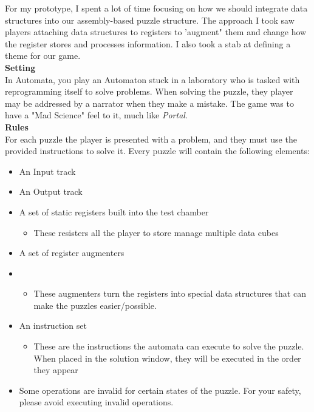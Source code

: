 For my prototype, I spent a lot of time focusing on how we should integrate data structures into our assembly-based
puzzle structure. The approach I took saw players attaching data structures to registers to 'augment" them and
change how the register stores and processes information. I also took a stab at defining a theme for our game.\\

\textbf{Setting}\\
In Automata, you play an Automaton stuck in a laboratory who is tasked with reprogramming itself to solve problems.
When solving the puzzle, they player may be addressed by a narrator when they make a mistake. The game was to have 
a "Mad Science" feel to it, much like \textit{Portal}.\\

\textbf{Rules}\\
For each puzzle the player is presented with a problem, and they must use the provided instructions to solve it. 
Every puzzle will contain the following elements:

\begin{itemize}
    \item An Input track
    \item An Output track
    \item A set of static registers built into the test chamber
    \begin{itemize}
        \item These resisters all the player to store manage multiple data cubes
    \end{itemize}
    \item A set of register augmenters
    \item \begin{itemize}
        \item These augmenters turn the registers into special data structures that can make the puzzles easier/possible.
    \end{itemize}
    \item An instruction set
    \begin{itemize}
        \item These are the instructions the automata can execute to solve the puzzle. When placed in the solution window,
        they will be executed in the order they appear
    \end{itemize}
    \item Some operations are invalid for certain states of the puzzle. For your safety, please avoid executing invalid operations.
\end{itemize}

